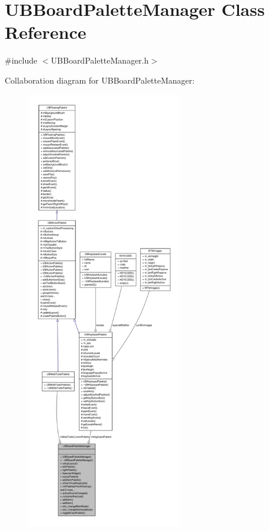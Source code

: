 \hypertarget{class_u_b_board_palette_manager}{\section{U\-B\-Board\-Palette\-Manager Class Reference}
\label{dc/d38/class_u_b_board_palette_manager}
}


{\ttfamily \#include $<$U\-B\-Board\-Palette\-Manager.\-h$>$}



Collaboration diagram for U\-B\-Board\-Palette\-Manager\-:
\nopagebreak
\begin{figure}[H]
\begin{center}
\leavevmode
\includegraphics[height=550pt]{d3/d39/class_u_b_board_palette_manager__coll__graph}
\end{center}
\end{figure}
